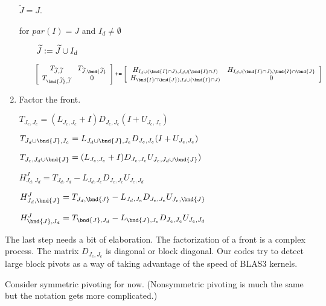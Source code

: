 \begin{enumerate}
\par $\widetilde J = J$.
\par for $par(I) = J$ and $I_d \ne \emptyset$
\par
$\mbox{\qquad} {\widetilde J} := {\widetilde J} \cup I_d$
\par
$\mbox{\qquad} \displaystyle
\left \lbrack \begin{array}{cc}
T_{{\widetilde J},{\widetilde J}} & T_{{\widetilde J}, \bnd{{\widetilde J}}} \\
T_{\bnd{{\widetilde J}},{\widetilde J}} & 0
\end{array} \right \rbrack
\mbox{\tt +=}
\left \lbrack \begin{array}{cc}
H_{I_d \cup (\bnd{I} \cap J), I_d \cup (\bnd{I} \cap J)}
& H_{I_d \cup (\bnd{I} \cap J), \bnd{I} \cap \bnd{J}} \\
H_{\bnd{I} \cap \bnd{J}), I_d \cup (\bnd{I} \cap J)} & 0
\end{array} \right \rbrack
$
\item
Factor the front.
\par
$T_{J_e,J_e} 
    =  (L_{J_e,J_e} + I)D_{J_e,J_e} (I + U_{J_e,J_e})$
\par
$T_{J_d \cup \bnd{J},J_e} 
   = L_{J_d \cup \bnd{J},J_e} D_{J_e,J_e} (I + U_{J_e,J_e}) $
\par
$T_{J_e,J_d \cup \bnd{J}} 
   = (L_{J_e,J_e} + I)D_{J_e,J_e} U_{J_e,J_d \cup \bnd{J}})$
\par
$H_{J_d,J_d}^J 
   = T_{J_d,J_d} - L_{J_d, J_e} D_{J_e,J_e} U_{J_e,J_d}$
\par
$H_{J_d,\bnd{J}}^J 
   = T_{J_d,\bnd{J}} - L_{J_d, J_e} D_{J_e,J_e} U_{J_e,\bnd{J}}$
\par
$H_{\bnd{J},J_d}^J 
   = T_{\bnd{J},J_d} - L_{\bnd{J}, J_e} D_{J_e,J_e} U_{J_e,J_d}$
\end{enumerate}
The last step needs a bit of elaboration. 
The factorization of a front is a complex process.
The matrix $D_{J_e,J_e}$ is diagonal or block diagonal.
Our codes try to detect large block pivots as a way of taking
advantage of the speed of BLAS3 kernels.
\par
Consider symmetric pivoting for now. (Nonsymmetric pivoting is much
the same but the notation gets more complicated.)
